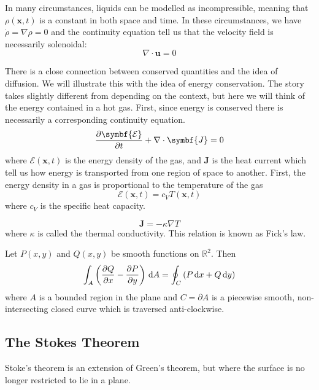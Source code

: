 In many circumstances, liquids can be modelled as incompressible, meaning
that $\rho\left(\symbf{x},t\right)$ is a constant in both space and time.
In these circumstances, we have $\dot{\rho}=\nabla\rho=0$ and the
continuity equation tell us that the velocity field is necessarily solenoidal:
\begin{equation*}
	\nabla\cdot\symbf{u}=0
\end{equation*}

There is a close connection between conserved quantities and the idea of diffusion.
We will illustrate this with the idea of energy conservation.
The story takes slightly different from depending on the context, but here we will
think of the energy contained in a hot gas.
First, since energy is conserved there is necessarily a corresponding
continuity equation.
\begin{equation*}
	\diffp{\symbf{\mathcal{E}}}{t}+\nabla\cdot\symbf{J}=0
\end{equation*}
where $\symbf{\mathcal{E}}\left(\symbf{x},t\right)$ is the energy density of the gas,
and $\symbf{J}$ is the heat current which tell us how energy is transported from
one region of space to another.
First, the energy density in a gas is proportional to the temperature of the gas
\begin{equation*}
	\symbf{\mathcal{E}}\left(\symbf{x},t\right)=
	c_{V}T\left(\symbf{x},t\right)
\end{equation*}
where $c_{V}$ is the specific heat capacity.

\begin{equation*}
	\symbf{J}=-\kappa\nabla T
\end{equation*}
where $\kappa$ is called the thermal conductivity.
This relation is known as Fick's law.

Let $P\left(x,y\right)$ and $Q\left(x,y\right)$ be smooth functions on $\mathbb{R}^{2}$.
Then
\begin{equation*}
	\int_{A}\left(\diffp{Q}{x}-\diffp{P}{y}\right)\dl A=
	\oint_{C}
	\left(P\dl x+Q\dl y\right)
\end{equation*}
where $A$ is a bounded region in the plane and $C=\partial A$ is a piecewise smooth,
non-intersecting closed curve which is traversed anti-clockwise.

\subsection{The Stokes Theorem}

Stoke's theorem is an extension of Green's theorem, but where the surface is no
longer restricted to lie in a plane.


